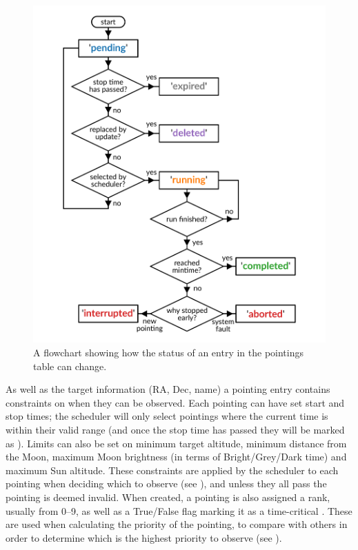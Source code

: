 \begin{colsection}
\begin{figure}[p]
    \begin{center}
        \includegraphics[width=\linewidth]{images/pointings_flowchart.pdf}
    \end{center}
    \caption[Pointing status progression flowchart]{
        A flowchart showing how the status of an entry in the pointings table can change.
    }\label{fig:pointings}
\end{figure}

As well as the target information (RA, Dec, name) a pointing entry contains constraints on when they can be observed. Each pointing can have set start and stop times; the scheduler will only select pointings where the current time is within their valid range (and once the stop time has passed they will be marked as ). Limits can also be set on minimum target altitude, minimum distance from the Moon, maximum Moon brightness (in terms of Bright/Grey/Dark time) and maximum Sun altitude. These constraints are applied by the scheduler to each pointing when deciding which to observe (see ), and unless they all pass the pointing is deemed invalid. When created, a pointing is also assigned a rank, usually from 0--9, as well as a True/False flag marking it as a time-critical . These are used when calculating the priority of the pointing, to compare with others in order to determine which is the highest priority to observe (see ).


\end{colsection}
